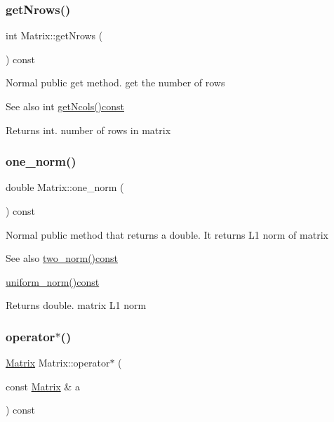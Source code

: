 \subsubsection{\texorpdfstring{get\+Nrows()}{getNrows()}}
{\footnotesize\ttfamily int Matrix\+::get\+Nrows (\begin{DoxyParamCaption}{ }\end{DoxyParamCaption}) const}

Normal public get method. get the number of rows \begin{DoxySeeAlso}{See also}
int \mbox{\hyperlink{classMatrix_ae0a5f2154953b8d129a90b04f91d9079}{get\+Ncols()const}} 
\end{DoxySeeAlso}
\begin{DoxyReturn}{Returns}
int. number of rows in matrix 
\end{DoxyReturn}
\mbox{\label{classMatrix_af4d468252f3ecbbcaa5726c76e332b4c}} 
\subsubsection{\texorpdfstring{one\+\_\+norm()}{one\_norm()}}
{\footnotesize\ttfamily double Matrix\+::one\+\_\+norm (\begin{DoxyParamCaption}{ }\end{DoxyParamCaption}) const}

Normal public method that returns a double. It returns L1 norm of matrix \begin{DoxySeeAlso}{See also}
\mbox{\hyperlink{classMatrix_aac496af05ec7aa26afc2b9c6d0ab8b66}{two\+\_\+norm()const}} 

\mbox{\hyperlink{classMatrix_a43066c7fe6418aad40170b85415063e8}{uniform\+\_\+norm()const}} 
\end{DoxySeeAlso}
\begin{DoxyReturn}{Returns}
double. matrix L1 norm 
\end{DoxyReturn}
\mbox{\label{classMatrix_aaa40c78e6b3bb5bbf572d35612dbf6a7}} 
\subsubsection{\texorpdfstring{operator$\ast$()}{operator*()}\hspace{0.1cm}{\footnotesize\ttfamily [1/2]}}
{\footnotesize\ttfamily \mbox{\hyperlink{classMatrix}{Matrix}} Matrix\+::operator$\ast$ (\begin{DoxyParamCaption}\item[{const \mbox{\hyperlink{classMatrix}{Matrix}} \&}]{a }\end{DoxyParamCaption}) const}

